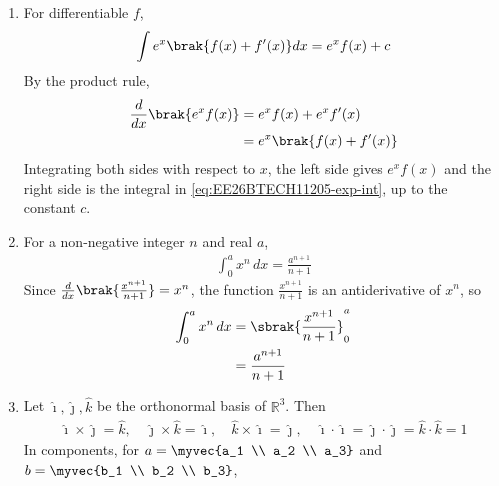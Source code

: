 \begin{enumerate}[label=\thesubsection.\arabic*, ref=\thesubsection.\theenumi]
\begin{align}
	\mydet{\vec{M}} = 0 \label{eq:EE26BTECH11205-det-prop}
\end{align}
\solution Let row $i$ of $\vec{M}$ be $k$ times row $j$, with $i \neq j$. Applying \eqref{eq:EE26BTECH11205-det-elem} with $\lambda = -k$, row $i$ of $\vec{E}\vec{M}$ becomes $k\,\text{row}_j - k\,\text{row}_j = \vec{0}$, and
\begin{align}
	\mydet{\vec{M}} &= \mydet{\vec{E}\vec{M}} \notag
	\\
	&= 0
\end{align}
because a matrix with a zero row has determinant $0$ (expand along that row).
\item For differentiable $f$,
\begin{align}
	\int e^x \brak{f(x) + f^{\prime}(x)}dx = e^x f(x) + c \label{eq:EE26BTECH11205-exp-int}
\end{align}
\solution By the product rule,
\begin{align}
	\frac{d}{dx}\brak{e^x f(x)} &= e^x f(x) + e^x f^{\prime}(x) \notag
	\\
	&= e^x\brak{f(x) + f^{\prime}(x)}
\end{align}
Integrating both sides with respect to $x$, the left side gives $e^x f(x)$ and the right side is the integral in \eqref{eq:EE26BTECH11205-exp-int}, up to the constant $c$.
\item For a non-negative integer $n$ and real $a$,
\begin{align}
	\int_{0}^{a}x^n\,dx = \frac{a^{n+1}}{n+1} \label{eq:EE26BTECH11205-power-int}
\end{align}
\solution Since $\frac{d}{dx}\brak{\frac{x^{n+1}}{n+1}} = x^n$, the function $\frac{x^{n+1}}{n+1}$ is an antiderivative of $x^n$, so
\begin{align}
	\int_{0}^{a}x^n\,dx &= \sbrak{\frac{x^{n+1}}{n+1}}_{0}^{a} \notag
	\\
	&= \frac{a^{n+1}}{n+1}
\end{align}
\item Let $\hat{\imath},\hat{\jmath},\hat{k}$ be the orthonormal basis of $\mathbb{R}^3$. Then
\begin{align}
	\hat{\imath}\times\hat{\jmath} = \hat{k}, \quad \hat{\jmath}\times\hat{k} = \hat{\imath}, \quad \hat{k}\times\hat{\imath} = \hat{\jmath}, \quad \hat{\imath}\cdot\hat{\imath} = \hat{\jmath}\cdot\hat{\jmath} = \hat{k}\cdot\hat{k} = 1 \label{eq:EE26BTECH11205-unit-cross}
\end{align}
In components, for $\vec{a} = \myvec{a_1 \\ a_2 \\ a_3}$ and $\vec{b} = \myvec{b_1 \\ b_2 \\ b_3}$,

\end{enumerate}
